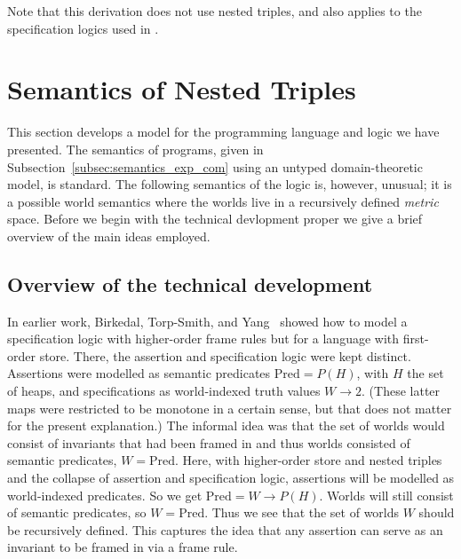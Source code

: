 \documentclass{LMCS}
\theoremstyle{remark}
\newcommand{\Pred}{\ensuremath{\mathrm{Pred}}\xspace}
\begin{document}
Note that this derivation does not use nested triples, and also applies to the specification logics used in \cite{BirkedalL:semslt-lmcs,Birkedal:Reus:Schwinghammer:Yang:08}.

 
\section{Semantics of Nested Triples}
\label{sec:Semantics}


This section develops a model for the programming language and logic we have presented. 
The semantics of programs, given in Subsection~\ref{subsec:semantics_exp_com} using an untyped domain-theoretic model, is standard. 
The following semantics of the logic is, however, unusual; it
is a possible world semantics where the worlds live in a  recursively defined {\em metric\/} space. 
Before we begin with the technical devlopment proper we give a brief overview of the main ideas employed.

\subsection{Overview of the technical development}
\label{sec:overview-of-technical-development}

In earlier work, Birkedal, Torp-Smith, and
Yang~\cite{BirkedalL:semslt-lmcs,Birkedal:Yang:parsepl-journal} showed
how to model a specification logic with higher-order frame rules but
for a language with first-order store. There, the assertion and specification 
logic were kept distinct. Assertions were modelled as semantic predicates
$\Pred=P(H)$, with $H$ the set of heaps,
and specifications as world-indexed truth values $W\to 2$. (These latter maps were
restricted to be monotone in a certain sense, but that does not matter for the present
explanation.)
The informal idea was that the set of worlds would consist of invariants that 
had been framed in and thus worlds consisted of semantic predicates, $W=\Pred$. Here, with 
higher-order store and nested triples and the collapse of assertion and
specification logic, assertions will be modelled as world-indexed predicates.
So we get $\Pred= W\to P(H)$. Worlds will still consist of semantic predicates,
so $W=\Pred$. Thus we see that the set of worlds $W$ should be recursively
defined.  This captures the idea that any assertion can serve as an invariant to 
be framed in via a frame rule.
\end{document}
